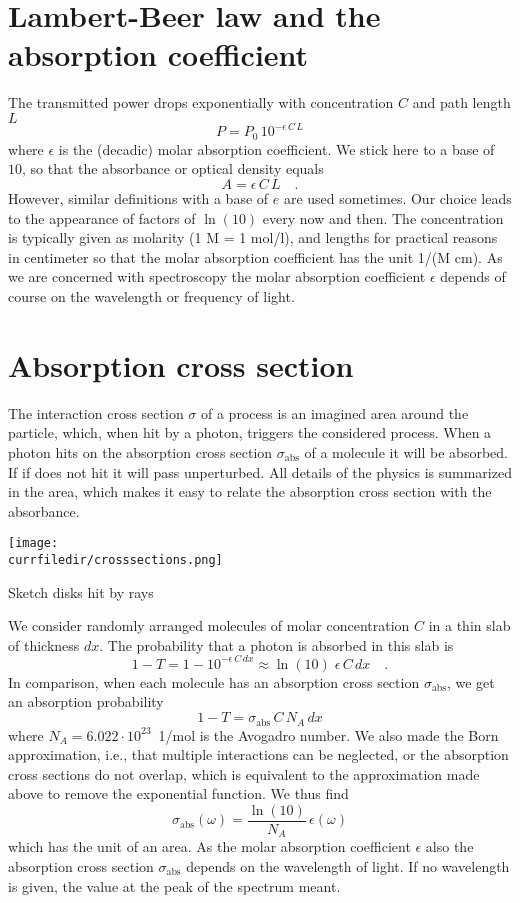 \section{Lambert-Beer law and the absorption coefficient}

The transmitted power drops exponentially with  concentration $C$ and  path length $L$
\[
 P = P_0 \, 10^{- \epsilon\, C \, L}
\]
where $\epsilon$ is the (decadic) molar absorption coefficient. We stick here to a base of $10$, 
so that the absorbance or optical density equals 
\[
 A = \epsilon\, C \, L \quad.
\]
However, similar definitions with a base of $e$ are used sometimes. Our choice leads to the appearance of factors of $\ln(10)$ every now and then. The concentration is typically given as molarity (1 M = 1 mol/l), and lengths for practical reasons in centimeter
so that the molar absorption coefficient has the unit 1/(M  cm). As we are concerned with spectroscopy the molar absorption coefficient $\epsilon$ depends of course on the wavelength or frequency of light.

\section{Absorption cross section}


The interaction cross section $\sigma$ of a process is an imagined area around the particle, which, when hit by a photon, triggers the considered process. When a photon hits on the absorption cross section $\sigma_{\text{abs}}$ of a molecule it will be absorbed. If if does not hit it will pass unperturbed. All details of the physics is summarized in the area, which makes it easy to relate the absorption cross section with the absorbance. 
\begin{marginfigure}
\texttt{[image: \\currfiledir/crosssections.png]}
\caption{Sketch  disks hit by rays}
\end{marginfigure}


We consider randomly arranged molecules of molar concentration $C$ in a thin slab of thickness $dx$. The probability that a photon is absorbed in this slab is
\[
 1 - T =1 -  10^{- \epsilon\, C \, dx} \approx \ln (10) \; \epsilon\, C \, dx \quad .
\]
In comparison, when each molecule has an absorption cross section $\sigma_{\text{abs}}$, we get an absorption probability 
\[
 1 - T = \sigma_{\text{abs}} \, C \, N_A \, dx
\]
where $N_A = 6.022 \cdot 10^{23}$~{1/mol} is the Avogadro number.  We also made the Born approximation, i.e., that multiple interactions can be neglected, or the absorption cross sections do not overlap, which is equivalent to the approximation made above to remove the exponential function.  We thus find
\[
 \sigma_{\text{abs}}(\omega) =  \frac{\ln(10)}{ N_A } \, \epsilon(\omega)
\]
which has the unit of an area. As the  molar absorption coefficient $\epsilon$  also the absorption cross section $\sigma_{\text{abs}}$ depends on the wavelength of light. If no wavelength is given, the value at the peak of the spectrum meant.


